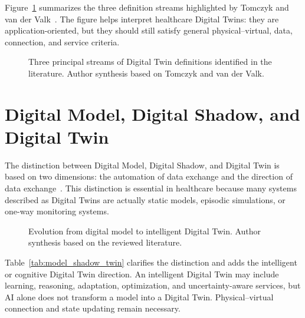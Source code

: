 Figure~\ref{fig:dt_definition_streams} summarizes the three definition streams highlighted by Tomczyk and van der Valk~\cite{tomczyk2022paradigm}. The figure helps interpret healthcare Digital Twins: they are application-oriented, but they should still satisfy general physical--virtual, data, connection, and service criteria.

\begin{figure}[H]
    \centering
    \resizebox{0.95\textwidth}{!}{}
    \caption{Three principal streams of Digital Twin definitions identified in the literature. Author synthesis based on Tomczyk and van der Valk.}
    \label{fig:dt_definition_streams}
\end{figure}

\section{Digital Model, Digital Shadow, and Digital Twin}
The distinction between Digital Model, Digital Shadow, and Digital Twin is based on two dimensions: the automation of data exchange and the direction of data exchange~\cite{kritzinger2018digital}. This distinction is essential in healthcare because many systems described as Digital Twins are actually static models, episodic simulations, or one-way monitoring systems.

\begin{figure}[H]
    \centering
    \resizebox{0.9\textwidth}{!}{}
    \caption{Evolution from digital model to intelligent Digital Twin. Author synthesis based on the reviewed literature.}
    \label{fig:dt_maturity}
\end{figure}

Table~\ref{tab:model_shadow_twin} clarifies the distinction and adds the intelligent or cognitive Digital Twin direction. An intelligent Digital Twin may include learning, reasoning, adaptation, optimization, and uncertainty-aware services, but AI alone does not transform a model into a Digital Twin. Physical--virtual connection and state updating remain necessary.

